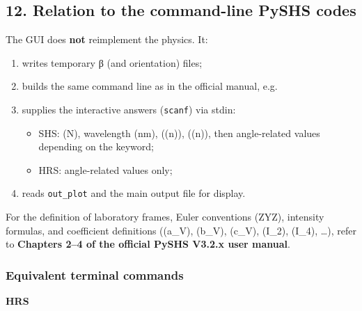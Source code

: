 \hypertarget{relation-to-the-command-line-pyshs-codes}{%
\subsection{12. Relation to the command-line PySHS
codes}\label{relation-to-the-command-line-pyshs-codes}}

The GUI does \textbf{not} reimplement the physics. It:

\begin{enumerate}
\def\labelenumi{\arabic{enumi}.}
\item
  writes temporary β (and orientation) files;\\
\item
  builds the same command line as in the official manual, e.g.~

\begin{Shaded}
\begin{Highlighting}[]
\end{Highlighting}
\end{Shaded}
\item
  supplies the interactive answers (\texttt{scanf}) via stdin:

  \begin{itemize}
  \tightlist
  \item
    SHS: (N), wavelength (nm), ((n)), ((n)), then
    angle-related values depending on the keyword;\\
  \item
    HRS: angle-related values only;\\
  \end{itemize}
\item
  reads \texttt{out\_plot} and the main output file for display.
\end{enumerate}

For the definition of laboratory frames, Euler conventions (ZYZ),
intensity formulas, and coefficient definitions ((a\_V), (b\_V), (c\_V),
(I\_2), (I\_4), \ldots), refer to \textbf{Chapters 2--4 of the official
PySHS V3.2.x user manual}.

\hypertarget{equivalent-terminal-commands}{%
\subsubsection{Equivalent terminal
commands}\label{equivalent-terminal-commands}}

\textbf{HRS}

